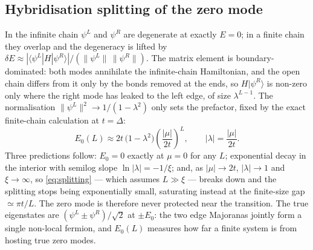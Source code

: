 \subsection{Hybridisation splitting of the zero mode}
\label{sec:splitting}
In the infinite chain $\psi^L$ and $\psi^R$ are degenerate at exactly $E = 0$;
in a finite chain they overlap and the degeneracy is lifted by
$\delta E \approx |\langle \psi^L|H|\psi^R\rangle| /
(\|\psi^L\|\,\|\psi^R\|)$. The matrix element is boundary-dominated: both
modes annihilate the infinite-chain Hamiltonian, and the open chain differs
from it only by the bonds removed at the ends, so $H|\psi^R\rangle$ is
non-zero only where the right mode has leaked to the left edge, of size
$\lambda^{L-1}$. The normalisation $\|\psi^L\|^2 \to 1/(1-\lambda^2)$ only
sets the prefactor, fixed by the exact finite-chain calculation at
$t = \Delta$:
\begin{equation}
  \boxed{\;
  E_0(L) \approx 2t\,\bigl(1-\lambda^2\bigr)
  \left(\frac{|\mu|}{2t}\right)^{\!L},
  \qquad |\lambda| = \frac{|\mu|}{2t} .
  \;}
  \label{eq:splitting}
\end{equation}
Three predictions follow: $E_0 = 0$ exactly at $\mu = 0$ for any $L$;
exponential decay in the interior with semilog slope $\ln|\lambda| = -1/\xi$;
and, as $|\mu| \to 2t$, $|\lambda| \to 1$ and $\xi \to \infty$, so
\eqref{eq:splitting} --- which assumes $L \gg \xi$ --- breaks down and the
splitting stops being exponentially small, saturating instead at the
finite-size gap $\simeq \pi t/L$. The zero mode is therefore never protected
near the transition. The true eigenstates are $(\psi^L \pm \psi^R)/\sqrt2$ at
$\pm E_0$: the two edge Majoranas jointly form a single non-local fermion, and
$E_0(L)$ measures how far a finite system is from hosting true zero modes.

